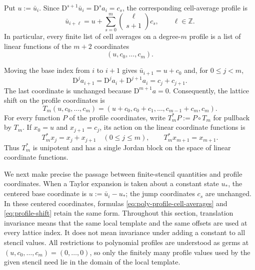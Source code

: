 \documentclass[11pt]{amsart}
\theoremstyle{plain}
\theoremstyle{definition}
\theoremstyle{remark}
\numberwithin{equation}{section}
\theoremstyle{plain}
\begin{document}
Put $u:=\bar u_i$.  Since
$\mathrm D^{s+1}\bar u_i=\mathrm D^sa_i=c_s$, the corresponding
cell-average profile is
\begin{equation}\label{eq:poly-profile-cell-averages}
	\bar u_{i+\ell}
	=u+\sum_{s=0}^{m}\binom{\ell}{s+1}c_s,
	\qquad \ell\in\mathbb Z.
\end{equation}
In particular, every finite list of cell averages on a degree-$m$ profile
is a list of linear functions of the $m+2$ coordinates
\begin{equation}\label{eq:profile-coordinate-vector}
	(u,c_0,\ldots,c_m).
\end{equation}

Moving the base index from $i$ to $i+1$ gives
$\bar u_{i+1}=u+c_0$ and, for $0\le j<m$,
\[
\mathrm D^ja_{i+1}
=\mathrm D^ja_i+\mathrm D^{j+1}a_i
=c_j+c_{j+1}.
\]
The last coordinate is unchanged because $\mathrm D^{m+1}a=0$.
Consequently, the lattice shift on the profile coordinates is
\begin{equation}\label{eq:profile-shift}
	T_m(u,c_0,\ldots,c_m)
	=
	(u+c_0,c_0+c_1,\ldots,c_{m-1}+c_m,c_m).
\end{equation}
For every function $P$ of the profile coordinates, write
$T_m^*P:=P\circ T_m$ for pullback by $T_m$.  If $x_0=u$ and
$x_{j+1}=c_j$, its action on the linear coordinate functions is
\begin{equation}\label{eq:profile-shift-linear-pullback}
	T_m^*x_j=x_j+x_{j+1}\quad(0\le j\le m),
	\qquad
	T_m^*x_{m+1}=x_{m+1}.
\end{equation}
Thus $T_m^*$ is unipotent and has a single Jordan block on the space of
linear coordinate functions.

We next make precise the passage between finite-stencil quantities and
profile coordinates.  When a Taylor expansion is taken about a constant
state $u_*$, the centered base coordinate is
$u:=\bar u_i-u_*$; the jump coordinates $c_s$ are unchanged.  In these
centered coordinates, formulas \eqref{eq:poly-profile-cell-averages} and
\eqref{eq:profile-shift} retain the same form.  Throughout this section,
translation invariance means that the same local template and
the same offsets are used at every lattice index.  It does not mean
invariance under adding a constant to all stencil values.  All restrictions
to polynomial profiles are understood as germs at
$(u,c_0,\ldots,c_m)=(0,\ldots,0)$, so only the finitely many profile values
used by the given stencil need lie in the domain of the local template.
\end{document}
